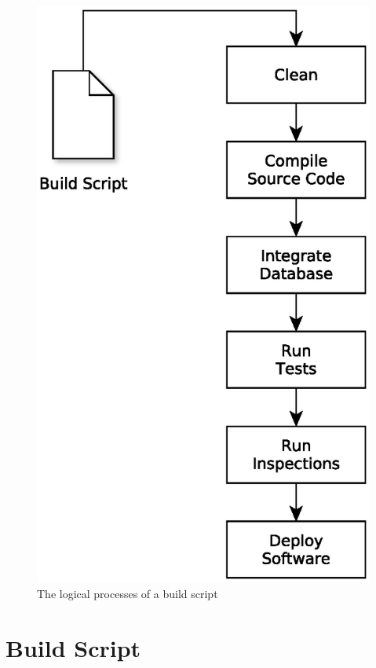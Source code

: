 \begin{figure}[H]
	\centering
	\includegraphics[scale=0.5]{yEd/the_logical_processes_of_a_build_script.eps}
	\caption{The logical processes of a build script\cite{CIPD}}
	\label{fig:lpobs}
\end{figure}

\section{Build Script}

